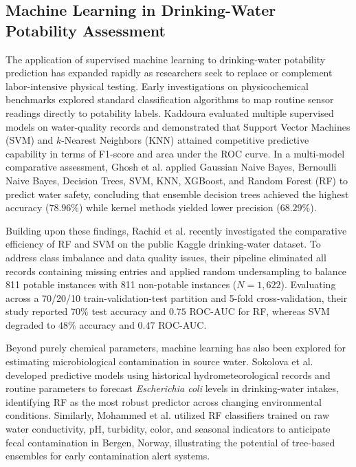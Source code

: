 \documentclass[pdflatex,sn-mathphys-num]{sn-jnl}%
\theoremstyle{thmstyleone}%
\theoremstyle{thmstyletwo}%
\theoremstyle{thmstylethree}%
\begin{document}
\subsection{Machine Learning in Drinking-Water Potability Assessment}\label{subsec2_1}
The application of supervised machine learning to drinking-water potability prediction has expanded rapidly as researchers seek to replace or complement labor-intensive physical testing. Early investigations on physicochemical benchmarks explored standard classification algorithms to map routine sensor readings directly to potability labels. Kaddoura \cite{kaddoura2022} evaluated multiple supervised models on water-quality records and demonstrated that Support Vector Machines (SVM) and $k$-Nearest Neighbors (KNN) attained competitive predictive capability in terms of F1-score and area under the ROC curve. In a multi-model comparative assessment, Ghosh et al. \cite{ghosh2023} applied Gaussian Naive Bayes, Bernoulli Naive Bayes, Decision Trees, SVM, KNN, XGBoost, and Random Forest (RF) to predict water safety, concluding that ensemble decision trees achieved the highest accuracy ($78.96\%$) while kernel methods yielded lower precision ($68.29\%$).

Building upon these findings, Rachid et al. \cite{rachid2025} recently investigated the comparative efficiency of RF and SVM on the public Kaggle drinking-water dataset. To address class imbalance and data quality issues, their pipeline eliminated all records containing missing entries and applied random undersampling to balance 811 potable instances with 811 non-potable instances ($N = 1,622$). Evaluating across a 70/20/10 train-validation-test partition and 5-fold cross-validation, their study reported $70\%$ test accuracy and $0.75$ ROC-AUC for RF, whereas SVM degraded to $48\%$ accuracy and $0.47$ ROC-AUC.

Beyond purely chemical parameters, machine learning has also been explored for estimating microbiological contamination in source water. Sokolova et al. \cite{sokolova2022} developed predictive models using historical hydrometeorological records and routine parameters to forecast \textit{Escherichia coli} levels in drinking-water intakes, identifying RF as the most robust predictor across changing environmental conditions. Similarly, Mohammed et al. \cite{mohammed2017} utilized RF classifiers trained on raw water conductivity, pH, turbidity, color, and seasonal indicators to anticipate fecal contamination in Bergen, Norway, illustrating the potential of tree-based ensembles for early contamination alert systems.
\end{document}
